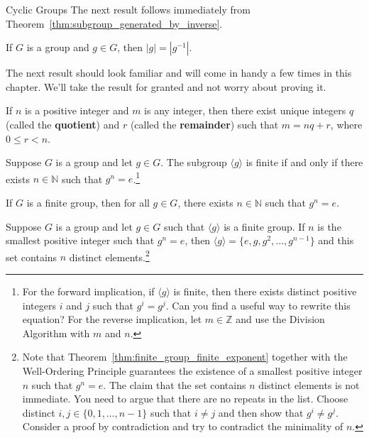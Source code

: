 \begin{section}{Cyclic Groups}
The next result follows immediately from Theorem~\ref{thm:subgroup_generated_by_inverse}.

\begin{theorem}
If $G$ is a group and $g\in G$, then $|g|=|g^{-1}|$.
\end{theorem}

The next result should look familiar and will come in handy a few times in this chapter. We'll take the result for granted and not worry about proving it.

\begin{theorem}
If $n$ is a positive integer and $m$ is any integer, then there exist unique integers $q$ (called the \textbf{quotient}) and $r$ (called the \textbf{remainder}) such that $m=nq+r$, where $0\leq r<n$.
\end{theorem}

\begin{theorem}\label{thm:finite_group_finite_exponent}
Suppose $G$ is a group and let $g\in G$. The subgroup $\langle g\rangle$ is finite if and only if there exists $n\in\mathbb{N}$ such that $g^n=e$.\footnote{For the forward implication, if $\langle g\rangle$ is finite, then there exists distinct positive integers $i$ and $j$ such that $g^i=g^j$.  Can you find a useful way to rewrite this equation? For the reverse implication, let $m\in\mathbb{Z}$ and use the Division Algorithm with $m$ and $n$.}
\end{theorem}

\begin{corollary}\label{cor:finite_group_finite_exponent}
If $G$ is a finite group, then for all $g\in G$, there exists $n\in\mathbb{N}$ such that $g^n=e$.
\end{corollary}

\begin{theorem}
Suppose $G$ is a group and let $g\in G$ such that $\langle g\rangle$ is a finite group. If $n$ is the smallest positive integer such that $g^n=e$, then $\langle g\rangle = \{e, g, g^2, \ldots, g^{n-1}\}$ and this set contains $n$ distinct elements.\footnote{Note that Theorem~\ref{thm:finite_group_finite_exponent} together with the Well-Ordering Principle guarantees the existence of a smallest positive integer $n$ such that $g^n=e$. The claim that the set contains $n$ distinct elements is not immediate.  You need to argue that there are no repeats in the list. Choose distinct $i,j\in\{0,1,\ldots,n-1\}$ such that $i\neq j$ and then show that $g^i\neq g^j$.  Consider a proof by contradiction and try to contradict the minimality of $n$.}
\end{theorem}


\end{section}
